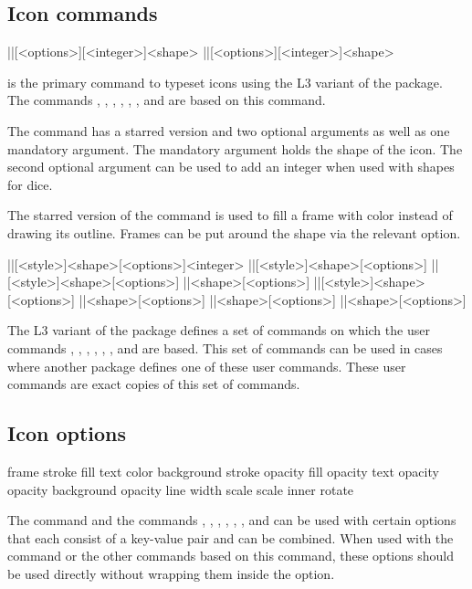 \documentclass[a4paper]{article}
\begin{document}
\subsection{Icon commands}

\begin{macrodef}
|\RPGIconsUseIcon|[<options>][<integer>]{<shape>}
|\RPGIconsUseIcon*|[<options>][<integer>]{<shape>}
\end{macrodef}
\macro{\RPGIconsUseIcon} is the primary command to typeset icons using the L3 variant of the package. The commands \macro{\die}, \macro{\ability}, \macro{\saving}, \macro{\spell}, \macro{\spellschool}, \macro{\damage}, \macro{\attack} and \macro{\condition} are based on this command.

The \macro{\RPGIconsUseIcon} command has a starred version and two optional arguments as well as one mandatory argument. The mandatory argument holds the shape of the icon. The second optional argument can be used to add an integer when used with shapes for dice.

The starred version of the command is used to fill a frame with color instead of drawing its outline. Frames can be put around the shape via the relevant  option.

\begin{macrodef}
|\RPGIconsDie|[<style>]{<shape>}[<options>]{<integer>}
|\RPGIconsAbiliy|[<style>]{<shape>}[<options>]
|\RPGIconsSaving|[<style>]{<shape>}[<options>]
|\RPGIconsSpell|{<shape>}[<options>]
|\RPGIconsSpellschool|[<style>]{<shape>}[<options>]
|\RPGIconsDamage|{<shape>}[<options>]
|\RPGIconsAttack|{<shape>}[<options>]
|\RPGIconsCondition|{<shape>}[<options>]
\end{macrodef}
The L3 variant of the package defines a set of commands on which the user commands \macro{\die}, \macro{\ability}, \macro{\saving}, \macro{\spell}, \macro{\spellschool}, \macro{\damage}, \macro{\attack} and \macro{\condition} are based. This set of commands can be used in cases where another package defines one of these user commands. These user commands are exact copies of this set of commands.

\subsection{Icon options}

\begin{macrodef}
frame
stroke
fill
text
color
background
stroke opacity
fill opacity
text opacity
opacity
background opacity
line width
scale
scale inner
rotate
\end{macrodef}
The \macro{\RPGIconsUseIcon} command and the commands \macro{\die}, \macro{\ability}, \macro{\saving}, \macro{\spell}, \macro{\spellschool}, \macro{\damage}, \macro{\attack} and \macro{\condition} can be used with certain options that each consist of a key-value pair and can be combined. When used with the \macro{\RPGIconsUseIcon} command or the other commands based on this command, these options should be used directly without wrapping them inside the  option.
\end{document}
